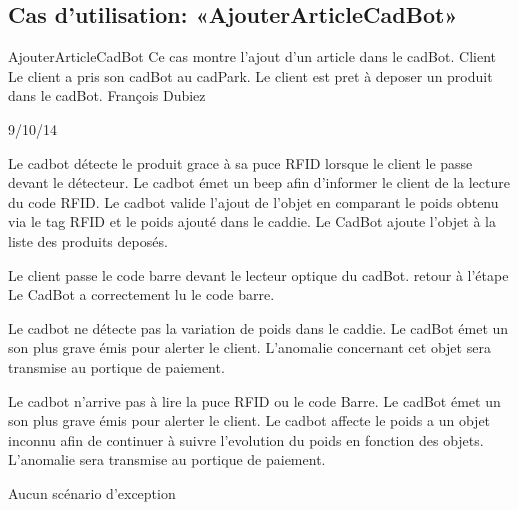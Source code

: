 \subsection{Cas d'utilisation: «AjouterArticleCadBot» }

\startCU
\nom AjouterArticleCadBot
\but Ce cas montre l'ajout d'un article dans le cadBot.
\acteur Client
\precondition Le client a pris son cadBot au cadPark.
\declenchement Le client est pret à deposer un produit dans le cadBot.
\auteur François Dubiez
\date 29/10/14

\nominal %
\startnominal
\etape[AAC:SA1] Le cadbot détecte le produit grace à sa puce RFID lorsque le client le passe devant le détecteur. 
 Le cadbot émet un beep afin d'informer le client de la lecture du code RFID.
\etape[AAC:SE1] Le cadbot valide l'ajout de l'objet en comparant le poids obtenu via le tag RFID et  le poids ajouté dans le caddie.
\stopnominal
\postcondition Le CadBot ajoute l'objet à la liste des produits deposés.

\alternatifs %
\startalternatif[AAC:SA1] %
  \etape[AAC:SE1] Le client passe le code barre devant le lecteur optique du cadBot.
  \etape retour à l'étape 
\stopcondition
\postcondition Le CadBot a correctement lu le code barre.
\stopalternatif

\startalternatif[AAC:SE1]
   \etape Le cadbot ne détecte pas la variation de poids dans le caddie.
   \etape Le cadBot émet un son plus grave émis pour alerter le client.
\stopcondition
\postcondition L'anomalie concernant cet objet sera transmise au portique de paiement.
\stopalternatif

\startalternatif[AAC:SA1]
   \etape Le cadbot n'arrive pas à lire la puce RFID ou le code Barre.
   \etape Le cadBot émet un son plus grave émis pour alerter le client.
   \etape Le cadbot affecte le poids a un objet inconnu afin de continuer à suivre l'evolution du poids en fonction des objets.
\stopcondition
\postcondition L'anomalie sera transmise au portique de paiement.
\stopalternatif

\exception %
Aucun scénario d'exception
\stopCU
